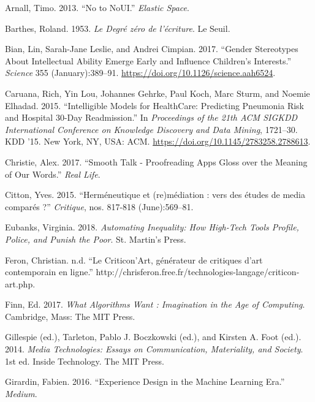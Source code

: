 \documentclass[]{article}
\begin{document}
\leavevmode\hypertarget{ref-Arnall2013}{}%
Arnall, Timo. 2013. ``No to NoUI.'' \emph{Elastic Space}.

\leavevmode\hypertarget{ref-Barthes1953}{}%
Barthes, Roland. 1953. \emph{Le Degré zéro de l'écriture}. Le Seuil.

\leavevmode\hypertarget{ref-Bian2017}{}%
Bian, Lin, Sarah-Jane Leslie, and Andrei Cimpian. 2017. ``Gender
Stereotypes About Intellectual Ability Emerge Early and Influence
Children's Interests.'' \emph{Science} 355 (January):389--91.
\url{https://doi.org/10.1126/science.aah6524}.

\leavevmode\hypertarget{ref-Caruana2015}{}%
Caruana, Rich, Yin Lou, Johannes Gehrke, Paul Koch, Marc Sturm, and
Noemie Elhadad. 2015. ``Intelligible Models for HealthCare: Predicting
Pneumonia Risk and Hospital 30-Day Readmission.'' In \emph{Proceedings
of the 21th ACM SIGKDD International Conference on Knowledge Discovery
and Data Mining}, 1721--30. KDD '15. New York, NY, USA: ACM.
\url{https://doi.org/10.1145/2783258.2788613}.

\leavevmode\hypertarget{ref-Christie2017}{}%
Christie, Alex. 2017. ``Smooth Talk - Proofreading Apps Gloss over the
Meaning of Our Words.'' \emph{Real Life}.

\leavevmode\hypertarget{ref-Citton2015}{}%
Citton, Yves. 2015. ``Herméneutique et (re)médiation : vers des études
de media comparés ?'' \emph{Critique}, nos. 817-818 (June):569--81.

\leavevmode\hypertarget{ref-Eubanks2018}{}%
Eubanks, Virginia. 2018. \emph{Automating Inequality: How High-Tech
Tools Profile, Police, and Punish the Poor}. St. Martin's Press.

\leavevmode\hypertarget{ref-Feron}{}%
Feron, Christian. n.d. ``Le Criticon'Art, générateur de critiques d'art
contemporain en ligne.''
http://chrisferon.free.fr/technologies-langage/criticon-art.php.

\leavevmode\hypertarget{ref-Finn2017}{}%
Finn, Ed. 2017. \emph{What Algorithms Want : Imagination in the Age of
Computing}. Cambridge, Mass: The MIT Press.

\leavevmode\hypertarget{ref-Gillespieed.2014}{}%
Gillespie (ed.), Tarleton, Pablo J. Boczkowski (ed.), and Kirsten A.
Foot (ed.). 2014. \emph{Media Technologies: Essays on Communication,
Materiality, and Society}. 1st ed. Inside Technology. The MIT Press.

\leavevmode\hypertarget{ref-Girardin2016}{}%
Girardin, Fabien. 2016. ``Experience Design in the Machine Learning
Era.'' \emph{Medium}.
\end{document}
